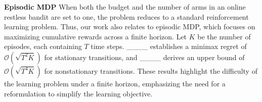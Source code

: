 \textbf{Episodic MDP\;\;} When both the budget and the number of arms in an online restless bandit are set to one, the problem reduces to a standard reinforcement learning problem. Thus, our work also relates to episodic MDP, which focuses on maximizing cumulative rewards across 
a finite horizon. Let $K$ be the number of episodes, each containing $T$ time steps. 
____ establishes a minimax regret of $\mathcal{O}\left(\sqrt{T^2K}\right)$ for stationary transitions, and ____ derives an upper bound of $\mathcal{O}\left(\sqrt{T^4K}\right)$ for nonstationary transitions. 
These results highlight the difficulty of the learning problem under a finite horizon, emphasizing the need for a reformulation to simplify the learning objective.
%